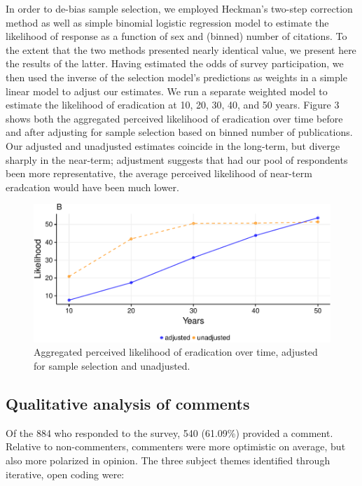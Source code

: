 \documentclass[]{article}
\begin{document}
In order to de-bias sample selection, we employed Heckman's two-step
correction method as well as simple binomial logistic regression model
to estimate the likelihood of response as a function of sex and (binned)
number of citations. To the extent that the two methods presented nearly
identical value, we present here the results of the latter. Having
estimated the odds of survey participation, we then used the inverse of
the selection model's predictions as weights in a simple linear model to
adjust our estimates. We run a separate weighted model to estimate the
likelihood of eradication at 10, 20, 30, 40, and 50 years. Figure 3
shows both the aggregated perceived likelihood of eradication over time
before and after adjusting for sample selection based on binned number
of publications. Our adjusted and unadjusted estimates coincide in the
long-term, but diverge sharply in the near-term; adjustment suggests
that had our pool of respondents been more representative, the average
perceived likelihood of near-term eradcation would have been much lower.

\begin{figure}[h]

{\centering \includegraphics{paper_files/figure-latex/unnamed-chunk-11-1} 

}

\caption{Aggregated perceived likelihood of eradication over time, adjusted for sample selection and unadjusted.}\label{fig:unnamed-chunk-11}
\end{figure}

\subsection{Qualitative analysis of
comments}\label{qualitative-analysis-of-comments}

Of the 884 who responded to the survey, 540 (61.09\%) provided a
comment. Relative to non-commenters, commenters were more optimistic on
average, but also more polarized in opinion. The three subject themes
identified through iterative, open coding were:
\end{document}
